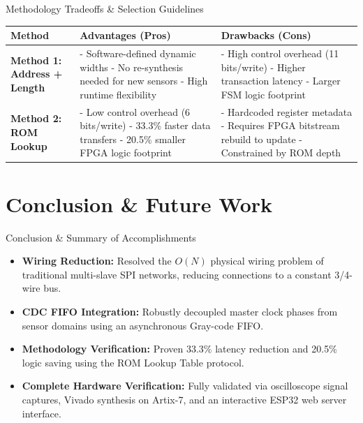\documentclass{beamer}
\begin{document}
\begin{frame}{Methodology Tradeoffs \& Selection Guidelines}
  \begin{table}
    \centering\tiny
    \begin{tabular}{lp{4.2cm}p{4.2cm}}
      \toprule
      \textbf{Method} & \textbf{Advantages (Pros)} & \textbf{Drawbacks (Cons)} \\
      \midrule
      \textbf{Method 1: Address + Length} & 
        - Software-defined dynamic widths \newline
        - No re-synthesis needed for new sensors \newline
        - High runtime flexibility & 
        - High control overhead (11 bits/write) \newline
        - Higher transaction latency \newline
        - Larger FSM logic footprint \\
      \midrule
      \textbf{Method 2: ROM Lookup} & 
        - Low control overhead (6 bits/write) \newline
        - 33.3\% faster data transfers \newline
        - 20.5\% smaller FPGA logic footprint & 
        - Hardcoded register metadata \newline
        - Requires FPGA bitstream rebuild to update \newline
        - Constrained by ROM depth \\
      \bottomrule
    \end{tabular}
  \end{table}
\end{frame}

\section{Conclusion \& Future Work}

\begin{frame}{Conclusion \& Summary of Accomplishments}
  \begin{itemize}
    \item \textbf{Wiring Reduction:} Resolved the $O(N)$ physical wiring problem of traditional multi-slave SPI networks, reducing connections to a constant 3/4-wire bus.
    \item \textbf{CDC FIFO Integration:} Robustly decoupled master clock phases from sensor domains using an asynchronous Gray-code FIFO.
    \item \textbf{Methodology Verification:} Proven 33.3\% latency reduction and 20.5\% logic saving using the ROM Lookup Table protocol.
    \item \textbf{Complete Hardware Verification:} Fully validated via oscilloscope signal captures, Vivado synthesis on Artix-7, and an interactive ESP32 web server interface.
  \end{itemize}
\end{frame}
\end{document}
